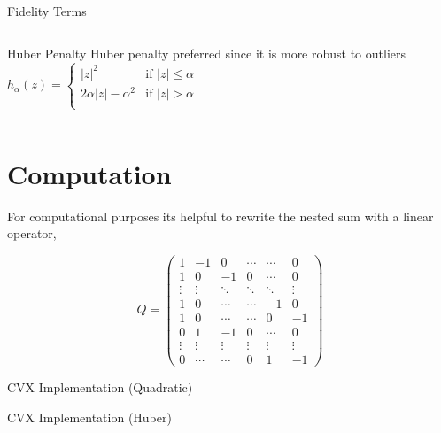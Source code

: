 \documentclass[12pt]{beamer}
\begin{document}
\begin{frame}{Fidelity Terms}
\begin{columns}[T]
\begin{column}{0.50\linewidth}
\begin{block}{Huber Penalty}
				{\footnotesize Huber penalty preferred since it is more robust to outliers} \\[1ex]
				$h_{\alpha}(z) = \begin{cases}
				|z|^2& \text{if } |z| \leq \alpha \\
				2\alpha|z| - \alpha^2& \text{if } |z| > \alpha \\
				\end{cases}$
			\end{block}
		\end{column}
	\end{columns}
\end{frame}


\section{Computation}

\begin{frame}
	
	For computational purposes its helpful to rewrite the nested sum with a linear operator,
	
	\[Q = \left( {\begin{array}{*{20}{c}}
		1&{ - 1}&0& \cdots & \cdots &0\\
		1&0&{ - 1}&0& \cdots &0\\
		\vdots & \vdots & \ddots & \ddots & \ddots & \vdots \\
		1&0& \cdots & \cdots &{ - 1}&0\\
		1&0& \cdots & \cdots &0&{ - 1}\\
		0&1&{ - 1}&0& \cdots &0\\
		\vdots & \vdots & \vdots & \vdots & \vdots & \vdots \\
		0& \cdots & \cdots &0&1&{ - 1}
		\end{array}} \right)\]
	
\end{frame}


\begin{frame}{CVX Implementation (Quadratic)}
	
\end{frame}


\begin{frame}{CVX Implementation (Huber)}
	
\end{frame}
\end{document}
